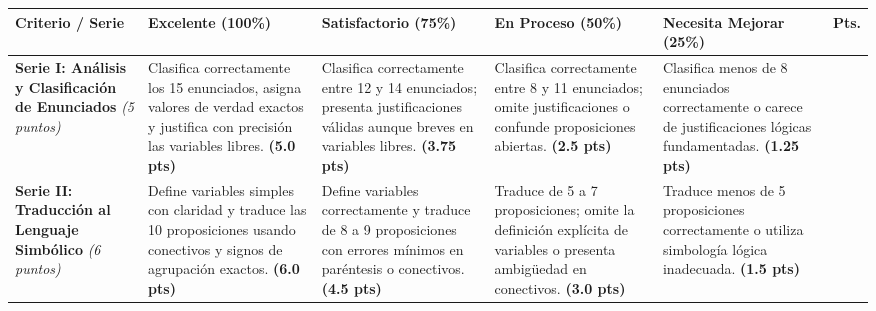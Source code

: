 \documentclass[11pt, letterpaper]{article}
\begin{document}
\noindent
\begin{tabularx}{\textwidth}{|p{3.1cm}|X|X|X|X|c|}
\hline
\rowcolor{AzulMontano}
\textbf{\color{white} Criterio / Serie} & 
\textbf{\color{white} Excelente (100\%)} & 
\textbf{\color{white} Satisfactorio (75\%)} & 
\textbf{\color{white} En Proceso (50\%)} & 
\textbf{\color{white} Necesita Mejorar (25\%)} & 
\textbf{\color{white} Pts.} \\
\hline

\textbf{Serie I: Análisis y Clasificación de Enunciados} \newline \textit{(5 puntos)} & 
Clasifica correctamente los 15 enunciados, asigna valores de verdad exactos y justifica con precisión las variables libres. \newline \textbf{(5.0 pts)} & 
Clasifica correctamente entre 12 y 14 enunciados; presenta justificaciones válidas aunque breves en variables libres. \newline \textbf{(3.75 pts)} & 
Clasifica correctamente entre 8 y 11 enunciados; omite justificaciones o confunde proposiciones abiertas. \newline \textbf{(2.5 pts)} & 
Clasifica menos de 8 enunciados correctamente o carece de justificaciones lógicas fundamentadas. \newline \textbf{(1.25 pts)} & 
\hspace{0.7cm} \\
\hline

\textbf{Serie II: Traducción al Lenguaje Simbólico} \newline \textit{(6 puntos)} & 
Define variables simples con claridad y traduce las 10 proposiciones usando conectivos y signos de agrupación exactos. \newline \textbf{(6.0 pts)} & 
Define variables correctamente y traduce de 8 a 9 proposiciones con errores mínimos en paréntesis o conectivos. \newline \textbf{(4.5 pts)} & 
Traduce de 5 a 7 proposiciones; omite la definición explícita de variables o presenta ambigüedad en conectivos. \newline \textbf{(3.0 pts)} & 
Traduce menos de 5 proposiciones correctamente o utiliza simbología lógica inadecuada. \newline \textbf{(1.5 pts)} & 
\hspace{0.7cm} \\
\hline


\end{tabularx}
\end{document}
